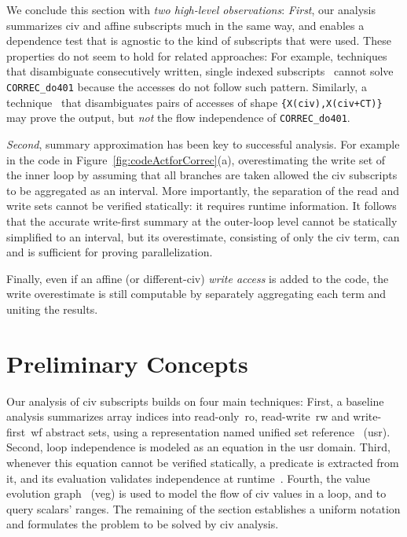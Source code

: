 \documentclass[10pt,nocopyrightspace]{sigplanconf}
\begin{document}
\vspace{1ex}
We conclude this section with {\em two high-level observations}: %
{\em First}, our analysis summarizes {\sc civ} and affine subscripts
much in the same way, and enables a dependence test that is agnostic
to the kind of subscripts that were used.
%
These properties do not seem to hold for related approaches: 
For example, techniques that disambiguate consecutively written,
single indexed subscripts~\cite{PaduaDemDrInterproc,VEG} cannot solve
{\tt CORREC\_do401} because the accesses do not follow such pattern.
Similarly, a technique~\cite{CohenBeyondMon} that disambiguates 
pairs of accesses of shape {\tt \{X(civ),X(civ+CT)\}} may prove the output,
but {\em not} the flow independence of {\tt CORREC\_do401}. 


{\em Second}, summary approximation has been key to successful
analysis. For example in the code in Figure~\ref{fig:codeActforCorrec}(a), 
overestimating the write set of the inner loop by assuming that all 
branches are taken allowed the {\sc civ} subscripts to be aggregated
as an interval. 
More importantly, the separation of the read and write sets cannot 
be verified statically: it requires runtime information. 
%
It follows that the accurate write-first summary at the 
outer-loop level cannot be statically simplified to an interval,
but its overestimate, consisting of only the {\sc civ} term, 
can and is sufficient for proving parallelization.

Finally, even if an affine (or different-{\sc civ})
{\em write access} is added to the code, the write overestimate
is still computable by separately aggregating each term and 
uniting the results.


\section{Preliminary Concepts}
\label{subsec:Background}


Our analysis of {\sc civ} subscripts builds on four main techniques: 
%
First, a baseline analysis summarizes array indices into read-only~{\sc ro}, 
read-write~{\sc rw} and write-first~{\sc wf} abstract sets, using a 
representation named unified set reference~\cite{HybAn} ({\sc usr}).
%
Second, loop independence is modeled as an equation in the 
{\sc usr} domain. 
%
Third, whenever this equation cannot be verified statically, a 
predicate is extracted from it, and its evaluation validates independence 
at runtime~\cite{CosPLDI}. 
%
Fourth, the value evolution graph~\cite{VEG} ({\sc veg}) is 
used to model the flow of {\sc civ} values in a loop, and to 
query scalars' ranges.
The remaining of the section establishes a uniform notation and 
formulates the problem to be solved by {\sc civ} analysis. 
\end{document}
